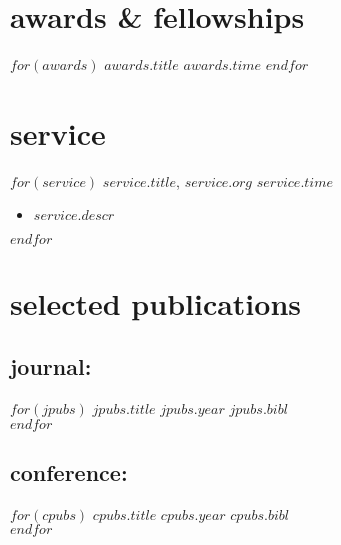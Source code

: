 \documentclass[]{friggeri-cv}
\begin{document}
\vspace{-0.05in}
\section{awards \& fellowships}
\begin{entrylist}
$for(awards)$
  \entryitem
  {$awards.title$}
  {$awards.time$}
$endfor$
\end{entrylist}



\vspace{-0.05in}
\section{service}
\begin{entrylist}
$for(service)$
  \entryitem
  {\textbf{\textit{$service.title$}}, $service.org$}
  {$service.time$}
  \begin{itemize}[noitemsep, leftmargin=0.2in]
    \item $service.descr$
  \end{itemize}
$endfor$
\end{entrylist}



\vspace{-0.05in}
\section{selected publications}

\vspace{-0.05in}
\subsection{journal:}
\begin{entrylist}
$for(jpubs)$
  \entrypub
  {$jpubs.title$}
  {$jpubs.year$}
  {$jpubs.bibl$}\\
$endfor$
\end{entrylist}

\vspace{-0.15in}
\subsection{conference:}
\begin{entrylist}
$for(cpubs)$
  \entrypub
  {$cpubs.title$}
  {$cpubs.year$}
  {$cpubs.bibl$}\\
$endfor$
\end{entrylist}
\end{document}
